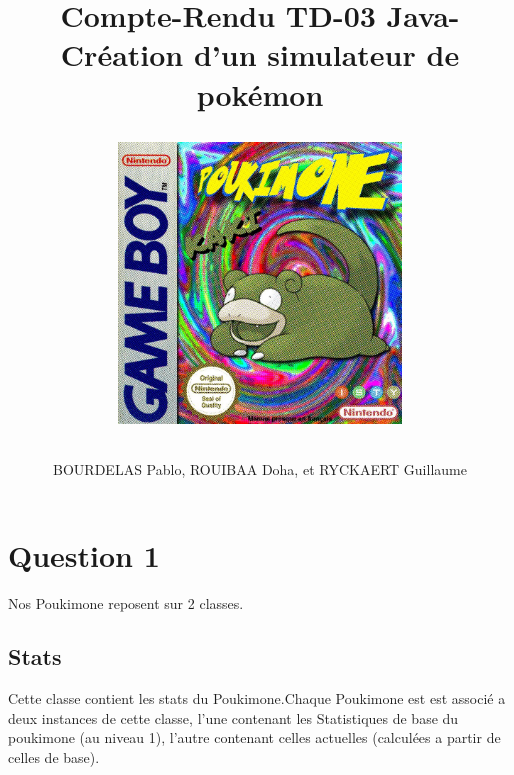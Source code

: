 \documentclass{report}
\begin{document}
\title{%
    \begin{minipage}\linewidth
        \centering
        Compte-Rendu TD-03 
        \vskip 3pt
        \large Java-Création d'un simulateur de pokémon
        \author{BOURDELAS Pablo, ROUIBAA Doha, et RYCKAERT Guillaume}
    \end{minipage}
\begin{figure}[ht!]
    \centering
    \includegraphics[width=75mm]{cover.jpg}
\end{figure}
    }   

\maketitle

\section*{Question 1}

Nos Poukimone reposent sur 2 classes.
\subsection*{Stats}
Cette classe contient les stats du Poukimone.Chaque Poukimone est est associé a deux instances de cette classe, l'une contenant les Statistiques de base du poukimone (au niveau 1), l'autre contenant celles actuelles (calculées a partir de celles de base).
\end{document}
